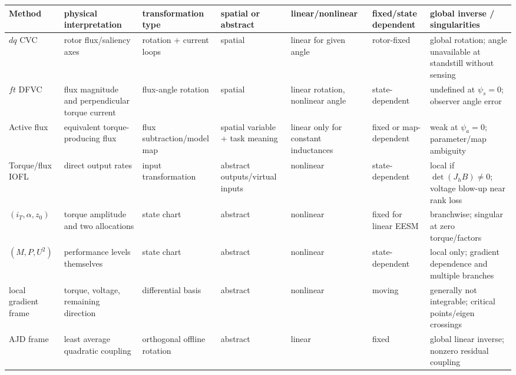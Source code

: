 \begin{landscape}
\begin{center}
\label{tab:coordinate-comparison-structural}
\scriptsize
\begin{tabularx}{\linewidth}{lXXXXXX}
\toprule
Method & physical interpretation & transformation type & spatial or abstract
& linear/nonlinear & fixed/state dependent & global inverse / singularities\\
\midrule
\(dq\) CVC & rotor flux/saliency axes & rotation + current loops & spatial &
linear for given angle & rotor-fixed & global rotation; angle unavailable at standstill without sensing\\
\(ft\) DFVC & flux magnitude and perpendicular torque current & flux-angle rotation & spatial &
linear rotation, nonlinear angle & state-dependent & undefined at \(\psi_s=0\); observer angle error\\
Active flux & equivalent torque-producing flux & flux subtraction/model map & spatial variable + task meaning &
linear only for constant inductances & fixed or map-dependent & weak at \(\psi_a=0\); parameter/map ambiguity\\
Torque/flux IOFL & direct output rates & input transformation & abstract outputs/virtual inputs &
nonlinear & state-dependent & local if \(\det(J_hB)\ne0\); voltage blow-up near rank loss\\
\((i_T,\alpha,z_0)\) & torque amplitude and two allocations & state chart & abstract &
nonlinear & fixed for linear EESM & branchwise; singular at zero torque/factors\\
\((M,P,U^2)\) & performance levels themselves & state chart & abstract &
nonlinear & state-dependent & local only; gradient dependence and multiple branches\\
local gradient frame & torque, voltage, remaining direction & differential basis & abstract &
nonlinear & moving & generally not integrable; critical points/eigen crossings\\
AJD frame & least average quadratic coupling & orthogonal offline rotation & abstract &
linear & fixed & global linear inverse; nonzero residual coupling\\
\bottomrule
\end{tabularx}
\end{center}
\end{landscape}

